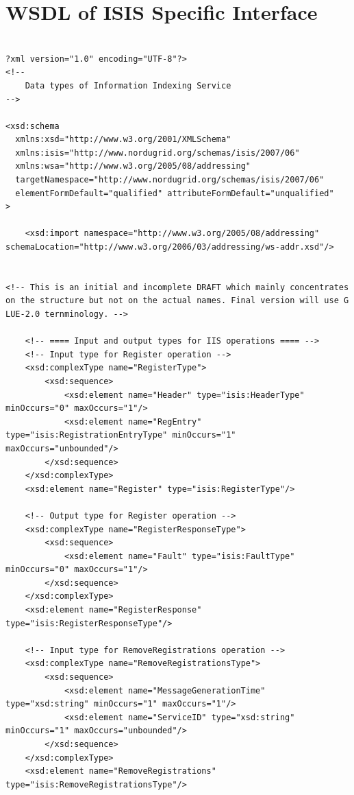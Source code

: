 \documentclass{book}
\begin{document}
\section{WSDL of ISIS Specific Interface}
\label{annex:isis_wsdl}
\begin{verbatim}

?xml version="1.0" encoding="UTF-8"?>
<!--
    Data types of Information Indexing Service
-->

<xsd:schema
  xmlns:xsd="http://www.w3.org/2001/XMLSchema"
  xmlns:isis="http://www.nordugrid.org/schemas/isis/2007/06"
  xmlns:wsa="http://www.w3.org/2005/08/addressing"
  targetNamespace="http://www.nordugrid.org/schemas/isis/2007/06"
  elementFormDefault="qualified" attributeFormDefault="unqualified"
>

    <xsd:import namespace="http://www.w3.org/2005/08/addressing" schemaLocation="http://www.w3.org/2006/03/addressing/ws-addr.xsd"/>


<!-- This is an initial and incomplete DRAFT which mainly concentrates on the structure but not on the actual names. Final version will use G
LUE-2.0 ternminology. -->

    <!-- ==== Input and output types for IIS operations ==== -->
    <!-- Input type for Register operation -->
    <xsd:complexType name="RegisterType">
        <xsd:sequence>
            <xsd:element name="Header" type="isis:HeaderType" minOccurs="0" maxOccurs="1"/>
            <xsd:element name="RegEntry" type="isis:RegistrationEntryType" minOccurs="1" maxOccurs="unbounded"/>
        </xsd:sequence>
    </xsd:complexType>
    <xsd:element name="Register" type="isis:RegisterType"/>

    <!-- Output type for Register operation -->
    <xsd:complexType name="RegisterResponseType">
        <xsd:sequence>
            <xsd:element name="Fault" type="isis:FaultType" minOccurs="0" maxOccurs="1"/>
        </xsd:sequence>
    </xsd:complexType>
    <xsd:element name="RegisterResponse" type="isis:RegisterResponseType"/>

    <!-- Input type for RemoveRegistrations operation -->
    <xsd:complexType name="RemoveRegistrationsType">
        <xsd:sequence>
            <xsd:element name="MessageGenerationTime" type="xsd:string" minOccurs="1" maxOccurs="1"/>
            <xsd:element name="ServiceID" type="xsd:string" minOccurs="1" maxOccurs="unbounded"/>
        </xsd:sequence>
    </xsd:complexType>
    <xsd:element name="RemoveRegistrations" type="isis:RemoveRegistrationsType"/>


\end{verbatim}
\end{document}
